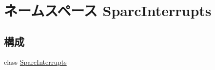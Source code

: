 \hypertarget{namespaceSparcInterrupts}{
\section{ネームスペース SparcInterrupts}
\label{namespaceSparcInterrupts}
}
\subsection*{構成}
\begin{DoxyCompactItemize}
\item 
class \hyperlink{classSparcInterrupts_1_1SparcInterrupts}{SparcInterrupts}
\end{DoxyCompactItemize}
